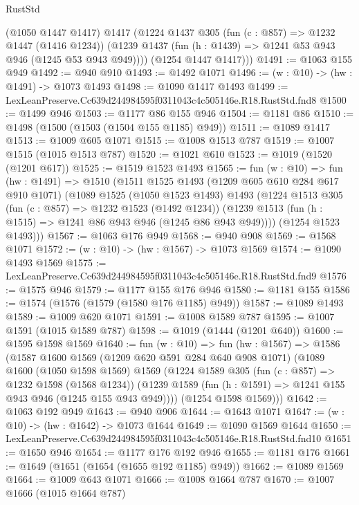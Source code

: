 \begin{lexlean}{RustStd}
\begin{coremodule}
        (@1050 @1447 @1417)
        @1417
        (@1224
          @1437
          @305
          (fun (c : @857) => @1232 @1447 (@1416 @1234))
          (@1239 @1437 (fun (h : @1439) => @1241 @53 @943 @946 (@1245 @53 @943 @949))))
        (@1254 @1447 @1417)))
@1491 := @1063 @155 @949
@1492 := @940 @910
@1493 := @1492 @1071
@1496 := (w : @10) -> (hw : @1491) -> @1073 @1493
@1498 := @1090 @1417 @1493
@1499 := LexLeanPreserve.Cc639d244984595f0311043c4c505146e.R18.RustStd.fnd8
@1500 := @1499 @946
@1503 := @1177 @86 @155 @946
@1504 := @1181 @86
@1510 := @1498 (@1500 (@1503 (@1504 @155 @1185) @949))
@1511 := @1089 @1417
@1513 := @1009 @605 @1071
@1515 := @1008 @1513 @787
@1519 := @1007 @1515 (@1015 @1513 @787)
@1520 := @1021 @610
@1523 := @1019 (@1520 (@1201 @617))
@1525 := @1519 @1523 @1493
@1565 := fun (w : @10) =>
  fun (hw : @1491) =>
  @1510
    (@1511
      @1525
      @1493
      (@1209 @605 @610 @284 @617 @910 @1071)
      (@1089
        @1525
        (@1050 @1523 @1493)
        @1493
        (@1224
          @1513
          @305
          (fun (c : @857) => @1232 @1523 (@1492 @1234))
          (@1239 @1513 (fun (h : @1515) => @1241 @86 @943 @946 (@1245 @86 @943 @949))))
        (@1254 @1523 @1493)))
@1567 := @1063 @176 @949
@1568 := @940 @908
@1569 := @1568 @1071
@1572 := (w : @10) -> (hw : @1567) -> @1073 @1569
@1574 := @1090 @1493 @1569
@1575 := LexLeanPreserve.Cc639d244984595f0311043c4c505146e.R18.RustStd.fnd9
@1576 := @1575 @946
@1579 := @1177 @155 @176 @946
@1580 := @1181 @155
@1586 := @1574 (@1576 (@1579 (@1580 @176 @1185) @949))
@1587 := @1089 @1493
@1589 := @1009 @620 @1071
@1591 := @1008 @1589 @787
@1595 := @1007 @1591 (@1015 @1589 @787)
@1598 := @1019 (@1444 (@1201 @640))
@1600 := @1595 @1598 @1569
@1640 := fun (w : @10) =>
  fun (hw : @1567) =>
  @1586
    (@1587
      @1600
      @1569
      (@1209 @620 @591 @284 @640 @908 @1071)
      (@1089
        @1600
        (@1050 @1598 @1569)
        @1569
        (@1224
          @1589
          @305
          (fun (c : @857) => @1232 @1598 (@1568 @1234))
          (@1239 @1589 (fun (h : @1591) => @1241 @155 @943 @946 (@1245 @155 @943 @949))))
        (@1254 @1598 @1569)))
@1642 := @1063 @192 @949
@1643 := @940 @906
@1644 := @1643 @1071
@1647 := (w : @10) -> (hw : @1642) -> @1073 @1644
@1649 := @1090 @1569 @1644
@1650 := LexLeanPreserve.Cc639d244984595f0311043c4c505146e.R18.RustStd.fnd10
@1651 := @1650 @946
@1654 := @1177 @176 @192 @946
@1655 := @1181 @176
@1661 := @1649 (@1651 (@1654 (@1655 @192 @1185) @949))
@1662 := @1089 @1569
@1664 := @1009 @643 @1071
@1666 := @1008 @1664 @787
@1670 := @1007 @1666 (@1015 @1664 @787)

\end{coremodule}
\end{lexlean}
